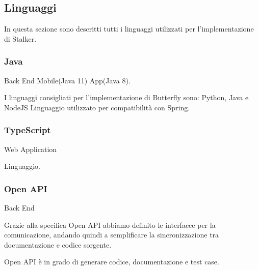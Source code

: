 \documentclass[../../../analisi-dei-requisiti.tex]{subfiles}
\begin{document}
\subsection{Linguaggi}%
\label{sub:linguaggi}
In questa sezione sono descritti tutti i linguaggi utilizzati per l'implementazione di Stalker.

\subsubsection{Java}%
\label{subs}
Back End Mobile(Java 11) App(Java 8).

I linguaggi consigliati per l'implementazione di Butterfly sono: Python, Java e NodeJS %
Linguaggio utilizzato per compatibilità con Spring.

\subsubsection{TypeScript}%
\label{subs:typescript}
Web Application

Linguaggio.

\subsubsection{Open API}%
\label{subs:open_api}
Back End

Grazie alla specifica Open API abbiamo definito le interfacce per la comunicazione, andando quindi a semplificare la sincronizzazione tra documentazione e codice sorgente.

Open API è in grado di generare codice, documentazione e test case.
\end{document}
